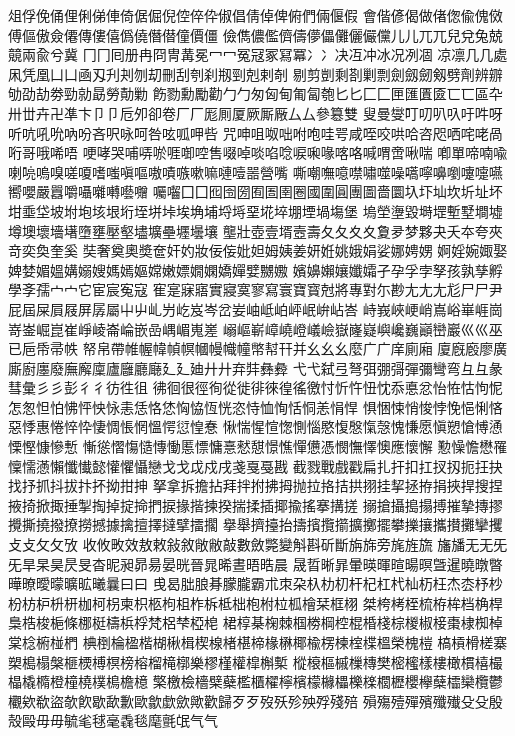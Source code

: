 俎俘俛俑俚俐俤俥倚倨倔倪倥倅伜俶倡倩倬俾俯們倆偃假
會偕偐偈做偖偬偸傀傚傅傴傲僉僊傳僂僖僞僥僭僣僮價僵
儉儁儂儖儕儔儚儡儺儷儼儻⼉儿⺎兀兒兌兔兢竸兩兪兮冀
⼌冂囘册冉冏冑冓冕⼍冖冤冦冢冩冪⼎冫决冱冲冰况冽凅
凉凛⼏几處凩凭凰⼐凵凾刄刋刔刎刧刪刮刳刹剏剄剋剌剞
剔剪剴剩剳剿剽劍劔劒剱劈劑辨辧劬劭劼劵勁勍勗勞勣勦
飭勠勳勵勸⼓勹匆匈甸匍匐匏匕⼔匚⼕匣匯匱匳⼖匸區卆
卅丗卉卍凖卞⼙卩卮夘卻卷⼚厂厖厠厦厥厮厰⼛厶參簒雙
叟曼燮叮叨叭叺吁吽呀听吭吼吮吶吩吝呎咏呵咎呟呱呷呰
咒呻咀呶咄咐咆哇咢咸咥咬哄哈咨咫哂咤咾咼哘哥哦唏唔
哽哮哭哺哢唹啀啣啌售啜啅啖啗唸唳啝喙喀咯喊喟啻啾喘
喞單啼喃喩喇喨嗚嗅嗟嗄嗜嗤嗔嘔嗷嘖嗾嗽嘛嗹噎噐營嘴
嘶嘲嘸噫噤嘯噬噪嚆嚀嚊嚠嚔嚏嚥嚮嚶嚴囂嚼囁囃囀囈囎
囑囓⼞囗囮囹圀囿圄圉圈國圍圓團圖嗇圜圦圷圸坎圻址坏
坩埀垈坡坿垉垓垠垳垤垪垰埃埆埔埒埓堊埖埣堋堙堝塲堡
塢塋塰毀塒堽塹墅墹墟墫墺壞墻墸墮壅壓壑壗壙壘壥壜壤
壟壯壺壹壻壼壽夂⼡夊⼢夐夛梦夥夬夭夲夸夾竒奕奐奎奚
奘奢奠奧奬奩奸妁妝佞侫妣妲姆姨姜妍姙姚娥娟娑娜娉娚
婀婬婉娵娶婢婪媚媼媾嫋嫂媽嫣嫗嫦嫩嫖嫺嫻嬌嬋嬖嬲嫐
嬪嬶嬾孃孅孀孑孕孚孛孥孩孰孳孵學斈孺⼧宀它宦宸寃寇
寉寔寐寤實寢寞寥寫寰寶寳尅將專對尓尠⺐⼪尢尨⼫尸尹
屁屆屎屓屐屏孱屬⼬屮乢屶屹岌岑岔妛岫岻岶岼岷峅岾峇
峙峩峽峺峭嶌峪崋崕崗嵜崟崛崑崔崢崚崙崘嵌嵒嵎嵋嵬嵳
嵶嶇嶄嶂嶢嶝嶬嶮嶽嶐嶷嶼巉巍巓巒巖⼮巛巫已巵帋帚帙
帑帛帶帷幄幃幀幎幗幔幟幢幤幇幵并⺓⼳幺麼⼴广庠廁廂
廈廐廏廖廣廝廚廛廢廡廨廩廬廱廳廰⼵廴廸⼶廾弃弉彝彜
⼷弋弑弖弩弭弸彁彈彌彎弯⺔彑彖彗彙⼺彡彭⼻彳彷徃徂
彿徊很徑徇從徙徘徠徨徭徼忖忻忤忸忱忝悳忿怡恠怙怐怩
怎怱怛怕怫怦怏怺恚恁恪恷恟恊恆恍恣恃恤恂恬恫恙悁悍
惧悃悚悄悛悖悗悒悧悋惡悸惠惓悴忰悽惆悵惘慍愕愆惶惷
愀惴惺愃愡惻惱愍愎慇愾愨愧慊愿愼愬愴愽慂慄慳慷慘慙
慚慫慴慯慥慱慟慝慓慵憙憖憇憬憔憚憊憑憫憮懌懊應懷懈
懃懆憺懋罹懍懦懣懶懺懴懿懽懼懾戀⼽戈戉戍戌戔戛戞戡
截戮戰戲戳扁扎扞扣扛扠扨扼抂抉找抒抓抖拔抃抔拗拑抻
拏拿拆擔拈拜拌拊拂拇抛拉挌拮拱挧挂挈拯拵捐挾捍搜捏
掖掎掀掫捶掣掏掉掟掵捫捩掾揩揀揆揣揉插揶揄搖搴搆搓
搦搶攝搗搨搏摧摯摶摎攪撕撓撥撩撈撼據擒擅擇撻擘擂擱
擧舉擠擡抬擣擯攬擶擴擲擺攀擽攘攜攅攤攣攫⽁攴⺙攵攷
收攸畋效敖敕敍敘敞敝敲數斂斃變斛斟斫斷旃旆旁旄旌旒
旛旙⽆无⺛旡旱杲昊昃旻杳昵昶昴昜晏晄晉晁晞晝晤晧晨
晟晢晰暃暈暎暉暄暘暝曁暹曉暾暼曄暸曖曚曠昿曦曩⽈曰
曵曷朏朖朞朦朧霸朮朿朶杁朸朷杆杞杠杙杣杤枉杰枩杼杪
枌枋枦枡枅枷柯枴柬枳柩枸柤柞柝柢柮枹柎柆柧檜栞框栩
桀桍栲桎梳栫桙档桷桿梟梏梭梔條梛梃檮梹桴梵梠梺椏梍
桾椁棊椈棘椢椦棡椌棍棔棧棕椶椒椄棗棣椥棹棠棯椨椪椚
椣椡棆楹楷楜楸楫楔楾楮椹楴椽楙椰楡楞楝榁楪榲榮槐榿
槁槓榾槎寨槊槝榻槃榧樮榑榠榜榕榴槞槨樂樛槿權槹槲槧
樅榱樞槭樔槫樊樒櫁樣樓橄樌橲樶橸橇橢橙橦橈樸樢檐檍
檠檄檢檣檗蘗檻櫃櫂檸檳檬櫞櫑櫟檪櫚櫪櫻欅蘖櫺欒欖鬱
欟欸欷盜欹飮歇歃歉歐歙歔歛歟歡歸⽍歹歿殀殄殃殍殘殕
殞殤殪殫殯殲殱⽎殳殷殼毆⽏毋毓毟毬毫毳毯麾氈氓⽓气
